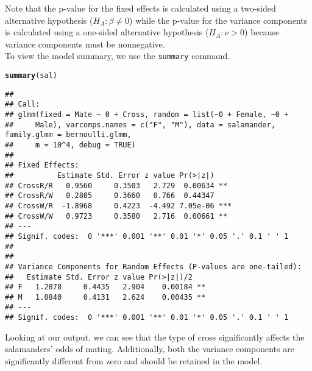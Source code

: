 \documentclass[11pt]{article}\usepackage[]{graphicx}\usepackage[]{color}
\makeatletter
\newcommand{\hlstd}[1]{\textcolor[rgb]{0.345,0.345,0.345}{#1}}%
\newcommand{\hlkwd}[1]{\textcolor[rgb]{0.737,0.353,0.396}{\textbf{#1}}}%
\newenvironment{kframe}{%
 \def\at@end@of@kframe{}%
 \ifinner\ifhmode%
  \def\at@end@of@kframe{\end{minipage}}%
  \begin{minipage}{\columnwidth}%
 \fi\fi%
 \def\FrameCommand##1{\hskip\@totalleftmargin \hskip-\fboxsep
 \colorbox{shadecolor}{##1}\hskip-\fboxsep
     \hskip-\linewidth \hskip-\@totalleftmargin \hskip\columnwidth}%
 \MakeFramed {\advance\hsize-\width
   \@totalleftmargin\z@ \linewidth\hsize
   \@setminipage}}%
 {\par\unskip\endMakeFramed%
 \at@end@of@kframe}
\newenvironment{knitrout}{}{} %
\makeatother
\begin{document}
Note that the p-value for the fixed effects is calculated using a two-sided alternative hypothesis ($H_A: \beta \neq 0$) while the p-value for the variance components is calculated using a one-sided alternative hypothesis ($H_A: \nu >0$) because variance components must be nonnegative.\\

To view the model summary, we use the \texttt{summary} command.\\
\begin{knitrout}
\color{fgcolor}\begin{kframe}
\begin{alltt}
\hlkwd{summary}\hlstd{(sal)}
\end{alltt}
\begin{verbatim}
## 
## Call:
## glmm(fixed = Mate ~ 0 + Cross, random = list(~0 + Female, ~0 + 
##     Male), varcomps.names = c("F", "M"), data = salamander, family.glmm = bernoulli.glmm, 
##     m = 10^4, debug = TRUE)
## 
## Fixed Effects:
##          Estimate Std. Error z value Pr(>|z|)    
## CrossR/R   0.9560     0.3503   2.729  0.00634 ** 
## CrossR/W   0.2805     0.3660   0.766  0.44347    
## CrossW/R  -1.8968     0.4223  -4.492 7.05e-06 ***
## CrossW/W   0.9723     0.3580   2.716  0.00661 ** 
## ---
## Signif. codes:  0 '***' 0.001 '**' 0.01 '*' 0.05 '.' 0.1 ' ' 1
## 
## 
## Variance Components for Random Effects (P-values are one-tailed):
##   Estimate Std. Error z value Pr(>|z|)/2   
## F   1.2878     0.4435   2.904    0.00184 **
## M   1.0840     0.4131   2.624    0.00435 **
## ---
## Signif. codes:  0 '***' 0.001 '**' 0.01 '*' 0.05 '.' 0.1 ' ' 1
\end{verbatim}
\end{kframe}
\end{knitrout}

Looking at our output, we can see that the type of cross significantly affects the salamanders' odds of mating. Additionally, both the variance components are significantly different from zero and should be retained in the model.\\
\end{document}
